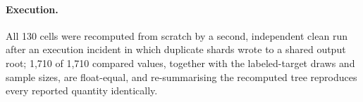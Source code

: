 
\paragraph{Execution.}  All 130 cells were recomputed from scratch by a second,
independent clean run after an execution incident in which duplicate shards
wrote to a shared output root; 1{,}710 of 1{,}710 compared values, together with
the labeled-target draws and sample sizes, are float-equal, and re-summarising the
recomputed tree reproduces every reported quantity identically.


